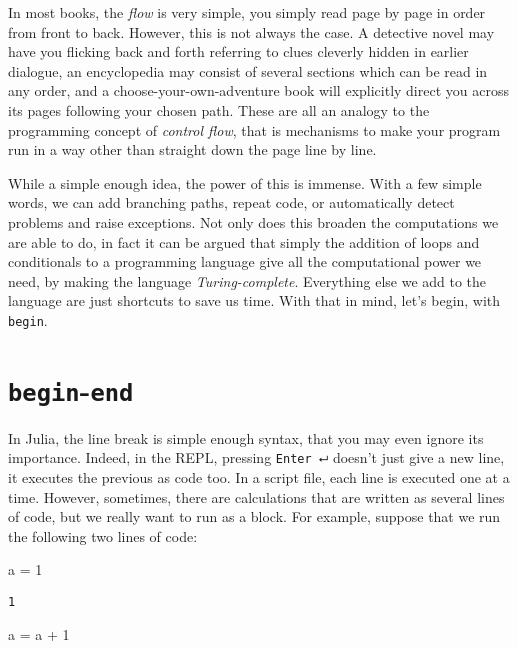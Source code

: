 \documentclass[
  letterpaper,
  DIV=11,
  numbers=noendperiod]{scrreprt}
\newenvironment{Shaded}{\begin{snugshade}}{\end{snugshade}}
\newcommand{\FloatTok}[1]{\textcolor[rgb]{0.68,0.00,0.00}{#1}}
\newcommand{\NormalTok}[1]{\textcolor[rgb]{0.00,0.23,0.31}{#1}}
\newcommand{\OperatorTok}[1]{\textcolor[rgb]{0.37,0.37,0.37}{#1}}
\begin{document}
In most books, the \emph{flow} is very simple, you simply read page by
page in order from front to back. However, this is not always the case.
A detective novel may have you flicking back and forth referring to
clues cleverly hidden in earlier dialogue, an encyclopedia may consist
of several sections which can be read in any order, and a
choose-your-own-adventure book will explicitly direct you across its
pages following your chosen path. These are all an analogy to the
programming concept of \emph{control flow}, that is mechanisms to make
your program run in a way other than straight down the page line by
line.

While a simple enough idea, the power of this is immense. With a few
simple words, we can add branching paths, repeat code, or automatically
detect problems and raise exceptions. Not only does this broaden the
computations we are able to do, in fact it can be argued that simply the
addition of loops and conditionals to a programming language give all
the computational power we need, by making the language
\emph{Turing-complete}. Everything else we add to the language are just
shortcuts to save us time. With that in mind, let's begin, with
\texttt{begin}.

\hypertarget{begin-end}{%
\section{\texorpdfstring{\texttt{begin}-\texttt{end}}{begin-end}}\label{begin-end}}

In Julia, the line break is simple enough syntax, that you may even
ignore its importance. Indeed, in the REPL, pressing \texttt{Enter\ ⮠}
doesn't just give a new line, it executes the previous as code too. In a
script file, each line is executed one at a time. However, sometimes,
there are calculations that are written as several lines of code, but we
really want to run as a block. For example, suppose that we run the
following two lines of code:

\begin{Shaded}
\begin{Highlighting}[]
\NormalTok{a }\OperatorTok{=} \FloatTok{1}
\end{Highlighting}
\end{Shaded}

\begin{verbatim}
1
\end{verbatim}

\begin{Shaded}
\begin{Highlighting}[]
\NormalTok{a }\OperatorTok{=}\NormalTok{ a }\OperatorTok{+} \FloatTok{1}
\end{Highlighting}
\end{Shaded}
\end{document}
